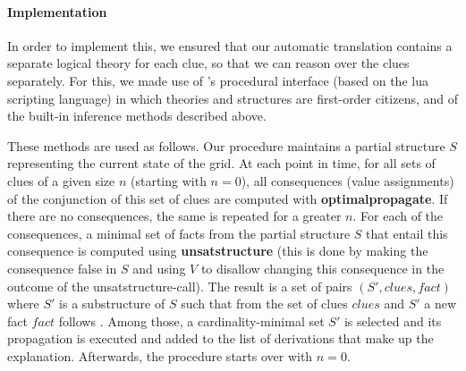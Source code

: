 \paragraph{Implementation}
In order to implement this, we ensured that our automatic translation contains a separate logical theory for each clue, so that we can reason over the clues separately. For this, we made use of \idp's procedural interface (based on the lua scripting language) in which theories and structures are first-order citizens, and of the built-in inference methods described above. 
% 

These methods are used as follows. Our procedure maintains a partial structure $S$ representing the current state of the grid. 
At each point in time, for all sets of clues of a given size $n$ (starting with $n=0$), all consequences (value assignments) of the conjunction of this set of clues are computed with \textbf{optimalpropagate}. 
If there are no consequences, the same is repeated for a greater $n$. 
For each of the consequences, a minimal set of facts from the partial structure $S$ that entail this consequence is computed using \textbf{unsatstructure} (this is done by making the consequence false in $S$ and using $V$ to disallow changing this consequence in the outcome of the unsatstructure-call). 
The result is a set of pairs $(S',\mathit{clues},\mathit{fact})$ where $S'$ is a substructure of $S$ such that from the set of clues $\mathit{clues}$ and $S'$ a new fact $\mathit{fact}$ follows . Among those, a cardinality-minimal set $S'$ is selected and its propagation is executed and added to the list of derivations that make up the explanation.
Afterwards, the procedure starts over with $n=0$. 

